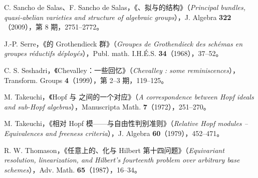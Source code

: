 \noindent [SS09] C. Sancho de Salas、F. Sancho de Salas，《、拟与的结构》（\textit{Principal bundles, quasi-abelian varieties and structure of algebraic groups}），J. Algebra \textbf{322}（2009），第 8 期，2751--2772。
\par\noindent [Se68] J.-P. Serre，《的 Grothendieck 群》（\textit{Groupes de Grothendieck des schémas en groupes réductifs déployés}），Publ. math. I.H.É.S. \textbf{34}（1968），37--52。
\par\noindent [Se99] C. S. Seshadri，《Chevalley：一些回忆》（\textit{Chevalley : some reminiscences}），Transform. Groups \textbf{4}（1999），第 2--3 期，119--125。
\par\noindent [Ta72] M. Takeuchi，《Hopf 与 之间的一个对应》（\textit{A correspondence between Hopf ideals and sub-Hopf algebras}），Manuscripta Math. \textbf{7}（1972），251--270。
\par\noindent [Ta79] M. Takeuchi，《相对 Hopf 模——与自由性判别准则》（\textit{Relative Hopf modules -- Equivalences and freeness criteria}），J. Algebra \textbf{60}（1979），452--471。
\par\noindent [Th87] R. W. Thomason，《任意上的、化与 Hilbert 第十四问题》（\textit{Equivariant resolution, linearization, and Hilbert’s fourteenth problem over arbitrary base schemes}），Adv. Math. \textbf{65}（1987），16--34。


